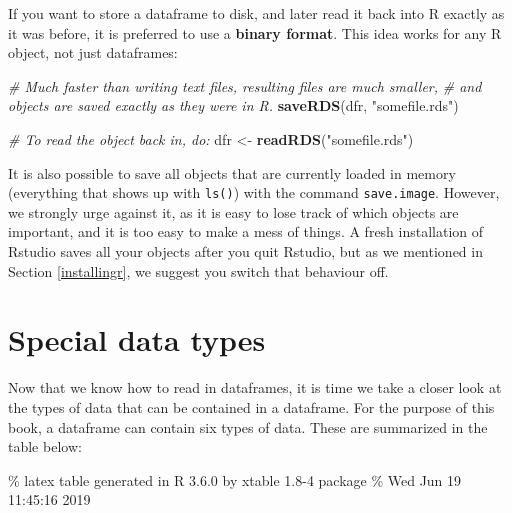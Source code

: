 \documentclass[]{book}
\newenvironment{Shaded}{\begin{snugshade}}{\end{snugshade}}
\newcommand{\CommentTok}[1]{\textcolor[rgb]{0.56,0.35,0.01}{\textit{#1}}}
\newcommand{\KeywordTok}[1]{\textcolor[rgb]{0.13,0.29,0.53}{\textbf{#1}}}
\newcommand{\NormalTok}[1]{#1}
\newcommand{\StringTok}[1]{\textcolor[rgb]{0.31,0.60,0.02}{#1}}
\begin{document}
If you want to store a dataframe to disk, and later read it back into R exactly as it was before, it is preferred to use a \textbf{binary format}. This idea works for any R object, not just dataframes:

\begin{Shaded}
\begin{Highlighting}[]
\CommentTok{# Much faster than writing text files, resulting files are much smaller,}
\CommentTok{# and objects are saved exactly as they were in R.}
\KeywordTok{saveRDS}\NormalTok{(dfr, }\StringTok{"somefile.rds"}\NormalTok{)}

\CommentTok{# To read the object back in, do:}
\NormalTok{dfr <-}\StringTok{ }\KeywordTok{readRDS}\NormalTok{(}\StringTok{"somefile.rds"}\NormalTok{)}
\end{Highlighting}
\end{Shaded}

It is also possible to save all objects that are currently loaded in memory (everything that shows up with \texttt{ls()}) with the command \texttt{save.image}. However, we strongly urge against it, as it is easy to lose track of which objects are important, and it is too easy to make a mess of things. A fresh installation of Rstudio saves all your objects after you quit Rstudio, but as we mentioned in Section \ref{installingr}, we suggest you switch that behaviour off.

\hypertarget{special-data-types}{%
\section{Special data types}\label{special-data-types}}

Now that we know how to read in dataframes, it is time we take a closer look at the types of data that can be contained in a dataframe. For the purpose of this book, a dataframe can contain six types of data. These are summarized in the table below:

\% latex table generated in R 3.6.0 by xtable 1.8-4 package
\% Wed Jun 19 11:45:16 2019
\end{document}
